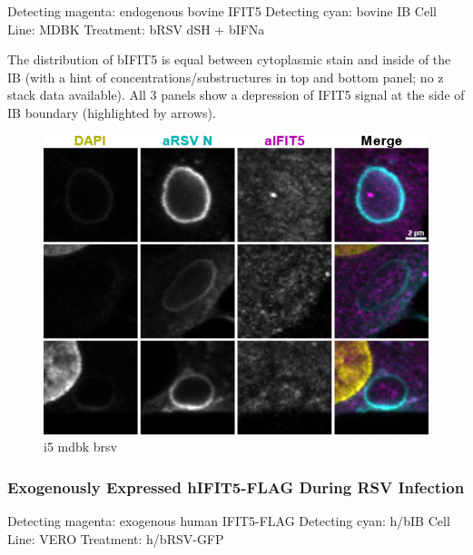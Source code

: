  \label{bIFIT5 Localisation During h/bRSV Infection}
Detecting magenta: endogenous bovine IFIT5 \newline
Detecting cyan: bovine IB \newline
Cell Line: MDBK \newline
Treatment: bRSV dSH + bIFNa \newline

The distribution of bIFIT5 is equal between cytoplasmic stain and inside of the IB (with a hint of concentrations/substructures in top and bottom panel; no z stack data available). All 3 panels show a depression of IFIT5 signal at the side of IB boundary (highlighted by arrows).

\begin{figure}
    \centering
    \includegraphics[width=1\linewidth]{09. Chapter 4/Figs/05. IFIT5/04. mdbk brsv.png}
    \caption[i5 mdbk brsv]{i5 mdbk brsv}
    \label{fig:i5 mdbk brsv}
\end{figure}

\subsubsection{Exogenously Expressed hIFIT5-FLAG During RSV Infection} \label{Exogenously Expressed hIFIT5-FLAG During RSV Infection}
Detecting magenta: exogenous human IFIT5-FLAG \newline
Detecting cyan: h/bIB \newline
Cell Line: VERO \newline
Treatment: h/bRSV-GFP \newline

